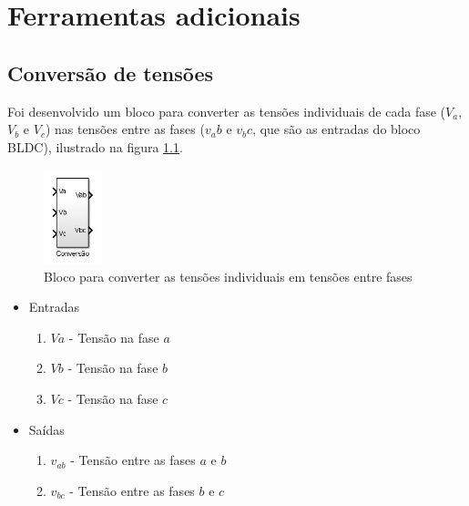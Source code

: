 \chapter{Ferramentas adicionais}

    \section{Conversão de tensões}
        Foi desenvolvido um bloco para converter as tensões individuais de cada fase ($V_a$, $V_b$ e $V_c$) nas tensões entre as fases ($v_ab$ e $v_bc$, que são as entradas do bloco BLDC), ilustrado na figura \ref{fig:bloco_conversao_tensoes}.
        \begin{figure}[ht]
            \centering
            \includegraphics[width = 0.15\textwidth]{bloco_conversao_tensoes}
            \caption{Bloco para converter as tensões individuais em tensões entre fases}
            \label{fig:bloco_conversao_tensoes}
        \end{figure}

        \begin{itemize}
            \item Entradas
                \begin{enumerate}
                    \item $Va$ - Tensão na fase $a$
                    \item $Vb$ - Tensão na fase $b$
                    \item $Vc$ - Tensão na fase $c$
                \end{enumerate}
            \item Saídas
                \begin{enumerate}
                    \item $v_{ab}$ - Tensão entre as fases $a$ e $b$
                    \item $v_{bc}$ - Tensão entre as fases $b$ e $c$
                \end{enumerate}
        \end{itemize}

    \newpage
